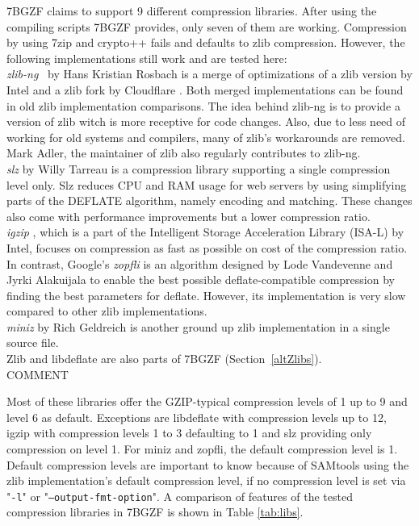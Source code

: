 7BGZF claims to support 9 different compression libraries. 
After using the compiling scripts 7BGZF provides, only seven of them are working. Compression by using 7zip and crypto++ fails and defaults to zlib compression. However, the following implementations still work and are tested here:\\
\textit{zlib-ng}~\cite{noauthor_zlib-ngzlib-ng_2024} by Hans Kristian Rosbach is a merge of optimizations of a zlib version by Intel \cite{noauthor_intelzlib_2024} and a zlib fork by Cloudflare \cite{noauthor_cloudflarezlib_2024}. Both merged implementations can be found in old zlib implementation comparisons. The idea behind zlib-ng is to provide a version of zlib witch is more receptive for code changes. Also, due to less need of working for old systems and compilers, many of zlib's workarounds are removed. Mark Adler, the maintainer of zlib also regularly contributes to zlib-ng.\\
\textit{slz} \cite{tarreau_wtarreaulibslz_2024} by Willy Tarreau is a compression library supporting a single compression level only. Slz reduces CPU and RAM usage for web servers by using simplifying parts of the DEFLATE algorithm, namely encoding and matching. These changes also come with performance improvements but a lower compression ratio.\\
\textit{igzip} \cite{tucker_isa-l_2017}, which is a part of the Intelligent Storage Acceleration Library (ISA-L) \cite{noauthor_intelisa-l_2024} by Intel, focuses on compression as fast as possible on cost of the compression ratio. \\
In contrast, Google's \textit{zopfli} \cite{noauthor_googlezopfli_2024} is an algorithm designed by Lode Vandevenne and Jyrki Alakuijala to enable the best possible deflate-compatible compression by finding the best parameters for deflate. However, its implementation is very slow compared to other zlib implementations. \\
\textit{miniz} \cite{noauthor_richgel999miniz_nodate} by Rich Geldreich is another ground up zlib implementation in a single source file. \\
Zlib and libdeflate are also parts of 7BGZF (Section~\ref{altZlibs}).\\

COMMENT

Most of these libraries offer the GZIP-typical compression levels of 1 up to 9 and level 6 as default. Exceptions are libdeflate with compression levels up to 12, igzip with compression levels 1 to 3 defaulting to 1 and slz providing only compression on level 1. For miniz and zopfli, the default compression level is 1. Default compression levels are important to know because of SAMtools using the zlib implementation's default compression level, if no compression level is set via "\texttt{-l}" or "\texttt{--output-fmt-option}". A comparison of features of the tested compression libraries in 7BGZF is shown in Table \ref{tab:libs}.

